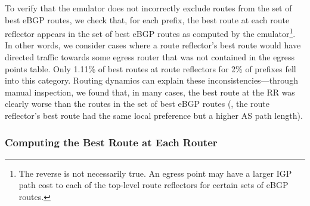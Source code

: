 To verify that the emulator does not incorrectly exclude routes from the
set of best eBGP routes, we check that, for each prefix, the best route
at each route reflector appears in the set of best eBGP routes as computed by
the emulator\footnote{The reverse is not necessarily true.  An
egress point may have a larger IGP path cost to each
of the top-level route reflectors for certain sets of eBGP routes.}.
In other words, we consider
cases where a route reflector's best route would have directed traffic towards
some egress router that was not contained in the {\dfc egress points}
table.  Only 1.11\% of best routes at route reflectors 
for 2\% of prefixes 
fell into this category.  %
Routing dynamics can explain these inconsistencies---through
manual inspection, we found that, in many cases, the best route at the
RR was clearly worse than the routes in the set of best eBGP routes
(\eg, the route reflector's best route had the same local preference but a higher
AS path length).  

\subsubsection{Computing the Best Route at Each Router}



